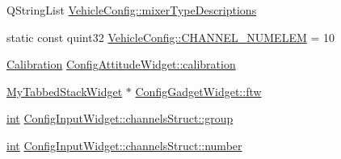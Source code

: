\begin{DoxyCompactItemize}
Q\-String\-List \hyperlink{group___config_plugin_ga05f4cbfd3c5b0fcc642f17003888459a}{Vehicle\-Config\-::mixer\-Type\-Descriptions}
\item 
static const quint32 \hyperlink{group___config_plugin_ga1d29d6e305c146323af055bb3657059f}{Vehicle\-Config\-::\-C\-H\-A\-N\-N\-E\-L\-\_\-\-N\-U\-M\-E\-L\-E\-M} = 10
\item 
\hyperlink{class_calibration}{Calibration} \hyperlink{group___config_plugin_ga4b85d588b6292a6f8755725ccca770fb}{Config\-Attitude\-Widget\-::calibration}
\item 
\hyperlink{class_my_tabbed_stack_widget}{My\-Tabbed\-Stack\-Widget} $\ast$ \hyperlink{group___config_plugin_ga86b1da74559f7e5f1e68bf0360b06dc5}{Config\-Gadget\-Widget\-::ftw}
\item 
\hyperlink{ioapi_8h_a787fa3cf048117ba7123753c1e74fcd6}{int} \hyperlink{group___config_plugin_gaebb67a5da44805269356236983a8c2d2}{Config\-Input\-Widget\-::channels\-Struct\-::group}
\item 
\hyperlink{ioapi_8h_a787fa3cf048117ba7123753c1e74fcd6}{int} \hyperlink{group___config_plugin_gaba81d9d5d38874bfa4f1c91ec8ff6ec3}{Config\-Input\-Widget\-::channels\-Struct\-::number}
\end{DoxyCompactItemize}
